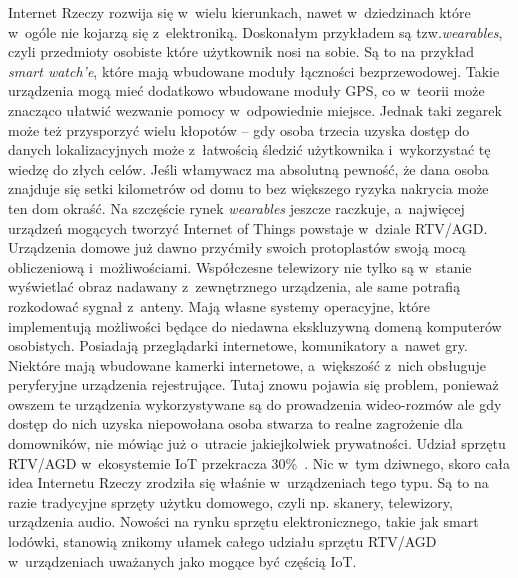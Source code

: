 \documentclass{xmgr}
\begin{document}
	Internet Rzeczy rozwija się w~wielu kierunkach, nawet w~dziedzinach które w~ogóle nie kojarzą się z~elektroniką. Doskonałym przykładem są tzw.\emph{wearables}, czyli przedmioty osobiste które użytkownik nosi na sobie. Są to na przykład \emph{smart watch'e}, które mają wbudowane moduły łączności bezprzewodowej.  Takie urządzenia mogą mieć dodatkowo wbudowane moduły GPS, co w~teorii może znacząco ułatwić wezwanie pomocy w~odpowiednie miejsce. Jednak taki zegarek może też przysporzyć wielu kłopotów – gdy osoba trzecia uzyska dostęp do danych lokalizacyjnych  może z~łatwością śledzić użytkownika i~wykorzystać tę wiedzę do złych celów. Jeśli włamywacz ma absolutną pewność, że dana osoba znajduje się setki kilometrów od domu to bez większego ryzyka nakrycia może ten dom okraść.
	Na szczęście rynek \emph{wearables} jeszcze raczkuje, a~najwięcej urządzeń mogących tworzyć Internet of Things powstaje w~dziale RTV/AGD. Urządzenia domowe już dawno przyćmiły swoich protoplastów swoją mocą obliczeniową i~możliwościami. Współczesne telewizory nie tylko są w~stanie wyświetlać obraz nadawany z~zewnętrznego urządzenia, ale same potrafią rozkodować sygnał z~anteny. Mają własne systemy operacyjne, które implementują możliwości będące do niedawna ekskluzywną domeną komputerów osobistych. Posiadają przeglądarki internetowe, komunikatory a~nawet gry. Niektóre mają wbudowane kamerki internetowe, a~większość z~nich obsługuje peryferyjne urządzenia rejestrujące. Tutaj znowu pojawia się problem, ponieważ owszem te urządzenia wykorzystywane są do prowadzenia wideo-rozmów ale gdy dostęp do nich uzyska niepowołana osoba stwarza to realne zagrożenie dla domowników, nie mówiąc już o~utracie jakiejkolwiek prywatności.
	Udział sprzętu RTV/AGD w~ekosystemie IoT przekracza 30\%~\cite{IotWPolsce:2015:CMC}. Nic w~tym dziwnego, skoro cała idea Internetu Rzeczy zrodziła się właśnie w~urządzeniach tego typu. Są to na razie tradycyjne sprzęty użytku domowego, czyli np. skanery, telewizory, urządzenia audio. Nowości na rynku sprzętu elektronicznego, takie jak smart lodówki, stanowią znikomy ułamek całego udziału sprzętu RTV/AGD w~urządzeniach uważanych jako mogące być częścią IoT.
\end{document}
